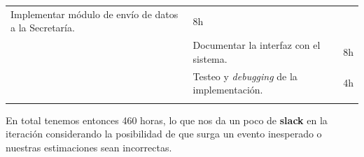 \begin{longtable}[c]{@{}lll@{}}
\begin{minipage}[t]{0.62\columnwidth}
Implementar módulo de envío de datos a la Secretaría.
\end{minipage} & \begin{minipage}[t]{0.10\columnwidth}\raggedright
8h
\end{minipage}
\\\noalign{\medskip}
\begin{minipage}[t]{0.28\columnwidth}\raggedright
\end{minipage} & \begin{minipage}[t]{0.62\columnwidth}\raggedright
Documentar la interfaz con el sistema.
\end{minipage} & \begin{minipage}[t]{0.10\columnwidth}\raggedright
8h
\end{minipage}
\\\noalign{\medskip}
\begin{minipage}[t]{0.28\columnwidth}\raggedright
\end{minipage} & \begin{minipage}[t]{0.62\columnwidth}\raggedright
Testeo y \emph{debugging} de la implementación.
\end{minipage} & \begin{minipage}[t]{0.10\columnwidth}\raggedright
4h
\end{minipage}
\\\noalign{\medskip}
\hline
\end{longtable}

En total tenemos entonces 460 horas, lo que nos da un poco de
\textbf{slack} en la iteración considerando la posibilidad de que surga
un evento inesperado o nuestras estimaciones sean incorrectas.


